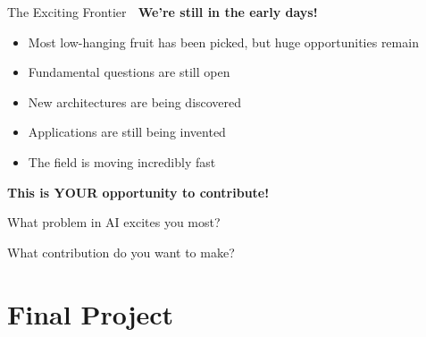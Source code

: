 \documentclass[aspectratio=169]{beamer}
\begin{document}
\begin{frame}{The Exciting Frontier 🚀}
\textbf{We're still in the early days!}

\vspace{0.5em}

\begin{itemize}\setlength{\itemsep}{0pt}
    \item Most low-hanging fruit has been picked, but huge opportunities remain
    \item Fundamental questions are still open
    \item New architectures are being discovered
    \item Applications are still being invented
    \item The field is moving incredibly fast
\end{itemize}

\vspace{1em}

\begin{center}
\Large
\textbf{This is YOUR opportunity to contribute!}
\end{center}

\vspace{1em}

\begin{thinkbox}
What problem in AI excites you most?

What contribution do you want to make?
\end{thinkbox}
\end{frame}

\section{Final Project}
\end{document}
